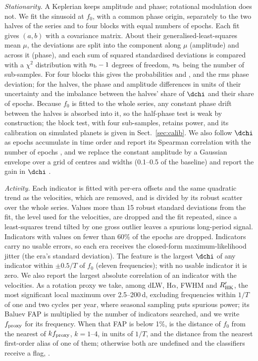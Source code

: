 \emph{Stationarity.} A Keplerian keeps amplitude and phase; rotational modulation
does not. We fit the sinusoid at $f_0$, with a common phase origin, separately to the
two halves of the series and to four blocks with equal numbers of epochs. Each fit
gives $(a, b)$ with a covariance matrix. About their generalised-least-squares mean
$\mu$, the deviations are split into the component along $\mu$ (amplitude) and across
it (phase), and each sum of squared standardised deviations is compared with a
$\chi^2$ distribution with $n_{\rm b} - 1$ degrees of freedom, $n_{\rm b}$ being the
number of sub-samples. For four blocks this gives the probabilities
 and , and the rms phase deviation; for
the halves, the phase and amplitude differences in units of their uncertainty and the
imbalance between the halves' share of $\dchi$ and their share of epochs. Because $f_0$
is fitted to the whole series, any constant phase drift between the halves is absorbed
into it, so the half-phase test is weak by construction; the block test, with four
sub-samples, retains power, and its calibration on simulated planets is given in
Sect.~\ref{sec:calib}. We also follow $\dchi$ as epochs accumulate in time order and
report its Spearman correlation with the number of epochs
\citep[cf.][]{MortierCC2017,Sreenivas2022}, and we replace the constant amplitude by a
Gaussian envelope over a grid of centres and widths (0.1--0.5 of the baseline) and
report the gain in $\dchi$ \citep[cf. the apodised sinusoids of][]{Hara2022b}.

\emph{Activity.} Each indicator is fitted with per-era offsets and the same quadratic trend
as the velocities, which are removed, and is divided by its robust scatter over the whole
series. Values more than 15 robust standard deviations from the fit, the level used for the
velocities, are dropped and the fit repeated, since a least-squares trend tilted by one
gross outlier leaves a spurious long-period signal. Indicators with values on fewer than
60\% of the epochs are dropped. Indicators carry no usable errors, so each era receives the
closed-form maximum-likelihood jitter (the era's standard deviation). The feature
 is the largest $\dchi$ of any indicator within $\pm 0.5/T$ of
$f_0$ (eleven frequencies); with no usable indicator it is zero. We also report the
largest absolute correlation of an indicator with the velocities. As a rotation proxy
we take, among dLW, H$\alpha$, FWHM and $R'_{\rm HK}$, the most significant local maximum
over 2.5--200\,d, excluding frequencies within $1/T$ of one and two cycles per year, where
seasonal sampling puts spurious power; its Baluev FAP is multiplied by the number of
indicators searched, and we write $f_{\rm proxy}$ for its frequency. When that FAP is below 1\%,  is
the distance of $f_0$ from the nearest of $k f_{\rm proxy}$, $k = 1$--4, in units of $1/T$, and  the
distance from the nearest first-order alias of one of them; otherwise both are
undefined and the classifiers receive a flag, .

